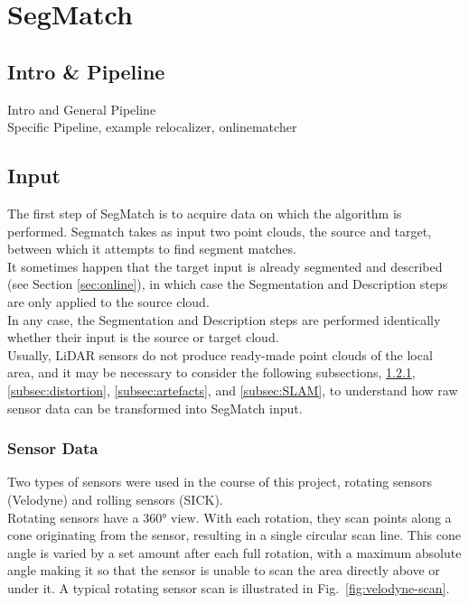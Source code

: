 \chapter{SegMatch}
\label{chap:segmatch}

\section{Intro \& Pipeline}
\label{sec:intro-pipeline}
Intro and General Pipeline\\

Specific Pipeline, example relocalizer, onlinematcher\\

\section{Input}
\label{sec:input}

The first step of SegMatch is to acquire data on which the algorithm is performed. Segmatch takes as input two point clouds, the source and target, between which it attempts to find segment matches.\\

It sometimes happen that the target input is already segmented and described (see Section \ref{sec:online}), in which case the Segmentation and Description steps are only applied to the source cloud.\\

In any case, the Segmentation and Description steps are performed identically whether their input is the source or target cloud.\\

Usually, LiDAR sensors do not produce ready-made point clouds of the local area, and it may be necessary to consider the following subsections, \ref{subsec:sensordata}, \ref{subsec:distortion}, \ref{subsec:artefacts}, and \ref{subsec:SLAM}, to understand how raw sensor data can be transformed into SegMatch input.

\subsection{Sensor Data}
\label{subsec:sensordata}

Two types of sensors were used in the course of this project, rotating sensors (Velodyne) and rolling sensors (SICK). \\

Rotating sensors have a 360° view. With each rotation, they scan points along a cone originating from the sensor, resulting in a single circular scan line. This cone angle is varied by a set amount after each full rotation, with a maximum absolute angle making it so that the sensor is unable to scan the area directly above or under it. A typical rotating sensor scan is illustrated in Fig.~\ref{fig:velodyne-scan}.\\ %


